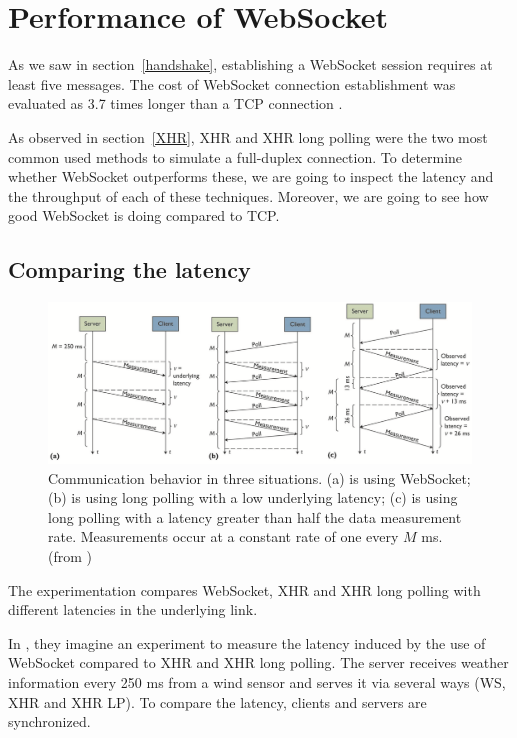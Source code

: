 \documentclass[10pt,journal,compsoc]{IEEEtran}
\newcommand{\ws}{WebSocket}
\begin{document}
\section{Performance of \ws{}}

As we saw in section~\ref{handshake}, establishing a \ws{} session requires at least five messages.
The cost of \ws{} connection establishment was evaluated as 3.7 times longer than a TCP connection \cite{performanceEvaluationOfWebsocketProtocol}. 

As observed in section~\ref{XHR}, XHR and XHR long polling were the two most common used methods to simulate a full-duplex connection.
To determine whether \ws{} outperforms these, we are going to inspect the latency and the throughput of each of these techniques.
Moreover, we are going to see how good \ws{} is doing compared to TCP.

\subsection{Comparing the latency}

\begin{figure}[!t]
    \centering
    \includegraphics[width=\textwidth]{comdisp.png}
    \caption{Communication behavior in three situations. (a) is using \ws{}; (b) is using long polling with a low underlying latency; (c) is using long polling with a latency greater than half the data measurement rate. Measurements occur at a constant rate of one every $M$ ms. (from \cite{communicationAndDIsplayingRealTimeDataWithWebSocket})}
    \label{fig:comdisp}
\end{figure}

The experimentation compares \ws{}, XHR and XHR long polling with different latencies in the underlying link.

In \cite{communicationAndDIsplayingRealTimeDataWithWebSocket}, they imagine an experiment to measure the latency induced by the use of \ws{} compared to XHR and XHR long polling.
The server receives weather information every 250 ms from a wind sensor and serves it via several ways (WS, XHR and XHR LP).
To compare the latency, clients and servers are synchronized.
\end{document}
